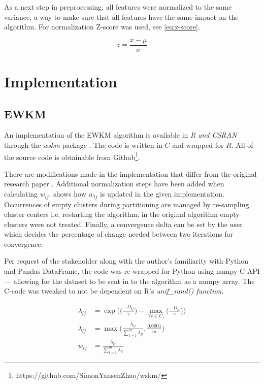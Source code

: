 \documentclass[../report.tex]{subfiles}
\begin{document}
As a next step in preprocessing, all features were normalized to the same variance, a way to make sure that all features have the same impact on the algorithm.
For normalization Z-score was used, see \cref{eq:z-score}.

\begin{equation}
  \label{eq:z-score}
  z = \frac{x - \mu}{\sigma}
\end{equation}

\section{Implementation}
\subsection{EWKM}
An implementation of the EWKM algorithm is available in \textit{R and CSRAN} through the \textit{wskm} package \cite{wskm2014hz}. The code is written in $C$ and wrapped for $R$. All of the source code is obtainable from Github\footnote{https://github.com/SimonYansenZhao/wskm/}.

There are modifications made in the implementation that differ from the original research paper \cite{Jing2007}. Additional normalization steps have been added when calculating $w_{lj}$.  shows how $w_{lj}$ is updated in the given implementation. Occurrences of empty clusters during partitioning are managed by re-sampling cluster centers i.e. restarting the algorithm; in the original algorithm empty clusters were not treated. Finally, a convergence delta can be set by the user which decides the percentage of change needed between two iterations for convergence.

Per request of the stakeholder along with the author's familiarity with Python and Pandas DataFrame, the code was re-wrapped for Python using numpy-C-API \cite{numpy-c} --- allowing for the dataset to be sent in to the algorithm as a numpy array. The C-code was tweaked to not be dependent on R's \textit{unif\_rand() function}.

\begin{align}
  \lambda_{lj} &= \exp\bigg({\Big(\frac{-D_{lj}}{\gamma}\Big) - \max_{\forall{t} \in C_l}\Big({\frac{-D_{lt}}{\gamma}}\Big)}\bigg) \\
  \lambda_{lj} &= \max\bigg(\frac{\lambda_{lj}}{\sum_{t=1}^{m}{\lambda_{lt}}}, \frac{0.0001}{m}\bigg)\\
  \label{eq:newlambda}
  w_{lj} &= \frac{\lambda_{lj}}{\sum^{m}_{t=1}{\lambda_{ lt }}}
\end{align}
\end{document}
